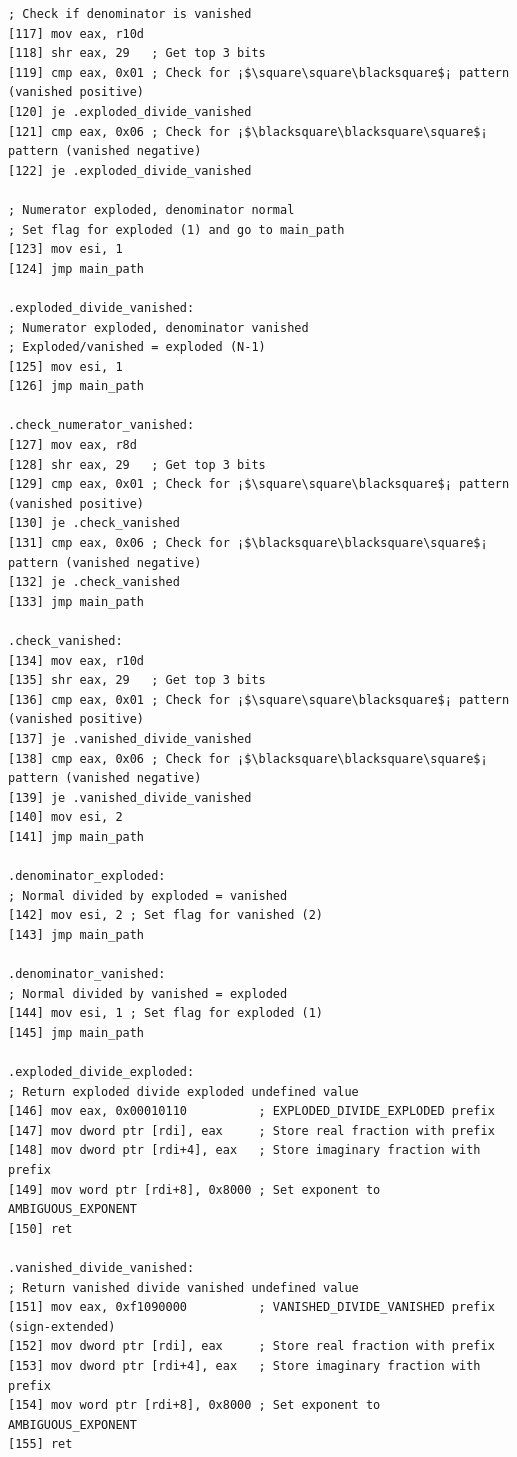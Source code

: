 \documentclass[12pt,letter]{article}
\begin{document}
\begin{lstlisting}[style=rust, caption={Complete Complex Division Assembly Implementation}, label={fig:circle_divide}]
; Check if denominator is vanished
[117] mov eax, r10d
[118] shr eax, 29   ; Get top 3 bits
[119] cmp eax, 0x01 ; Check for ¡$\square\square\blacksquare$¡ pattern (vanished positive)
[120] je .exploded_divide_vanished
[121] cmp eax, 0x06 ; Check for ¡$\blacksquare\blacksquare\square$¡ pattern (vanished negative)
[122] je .exploded_divide_vanished

; Numerator exploded, denominator normal
; Set flag for exploded (1) and go to main_path
[123] mov esi, 1
[124] jmp main_path

.exploded_divide_vanished:
; Numerator exploded, denominator vanished
; Exploded/vanished = exploded (N-1)
[125] mov esi, 1
[126] jmp main_path

.check_numerator_vanished:
[127] mov eax, r8d
[128] shr eax, 29   ; Get top 3 bits
[129] cmp eax, 0x01 ; Check for ¡$\square\square\blacksquare$¡ pattern (vanished positive)
[130] je .check_vanished
[131] cmp eax, 0x06 ; Check for ¡$\blacksquare\blacksquare\square$¡ pattern (vanished negative)
[132] je .check_vanished
[133] jmp main_path

.check_vanished:
[134] mov eax, r10d
[135] shr eax, 29   ; Get top 3 bits
[136] cmp eax, 0x01 ; Check for ¡$\square\square\blacksquare$¡ pattern (vanished positive)
[137] je .vanished_divide_vanished
[138] cmp eax, 0x06 ; Check for ¡$\blacksquare\blacksquare\square$¡ pattern (vanished negative)
[139] je .vanished_divide_vanished
[140] mov esi, 2
[141] jmp main_path

.denominator_exploded:
; Normal divided by exploded = vanished
[142] mov esi, 2 ; Set flag for vanished (2)
[143] jmp main_path

.denominator_vanished:
; Normal divided by vanished = exploded
[144] mov esi, 1 ; Set flag for exploded (1)
[145] jmp main_path

.exploded_divide_exploded:
; Return exploded divide exploded undefined value
[146] mov eax, 0x00010110          ; EXPLODED_DIVIDE_EXPLODED prefix
[147] mov dword ptr [rdi], eax     ; Store real fraction with prefix
[148] mov dword ptr [rdi+4], eax   ; Store imaginary fraction with prefix
[149] mov word ptr [rdi+8], 0x8000 ; Set exponent to AMBIGUOUS_EXPONENT
[150] ret

.vanished_divide_vanished:
; Return vanished divide vanished undefined value
[151] mov eax, 0xf1090000          ; VANISHED_DIVIDE_VANISHED prefix (sign-extended)
[152] mov dword ptr [rdi], eax     ; Store real fraction with prefix
[153] mov dword ptr [rdi+4], eax   ; Store imaginary fraction with prefix
[154] mov word ptr [rdi+8], 0x8000 ; Set exponent to AMBIGUOUS_EXPONENT
[155] ret


\end{lstlisting}
\end{document}

